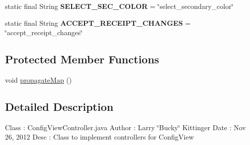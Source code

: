 \begin{DoxyCompactItemize}
\item 
\hypertarget{classw3se_1_1_controller_1_1_config_view_controller_ae34815d1e1caef9b87e6c4c20fe43bcd}{static final String {\bfseries S\-E\-L\-E\-C\-T\-\_\-\-S\-E\-C\-\_\-\-C\-O\-L\-O\-R} = \char`\"{}select\-\_\-secondary\-\_\-color\char`\"{}}\label{classw3se_1_1_controller_1_1_config_view_controller_ae34815d1e1caef9b87e6c4c20fe43bcd}

\item 
\hypertarget{classw3se_1_1_controller_1_1_config_view_controller_ab35e1546bf4d1a7c65c1eaf5a4ec601c}{static final String {\bfseries A\-C\-C\-E\-P\-T\-\_\-\-R\-E\-C\-E\-I\-P\-T\-\_\-\-C\-H\-A\-N\-G\-E\-S} = \char`\"{}accept\-\_\-receipt\-\_\-changes\char`\"{}}\label{classw3se_1_1_controller_1_1_config_view_controller_ab35e1546bf4d1a7c65c1eaf5a4ec601c}

\end{DoxyCompactItemize}
\subsection*{Protected Member Functions}
\begin{DoxyCompactItemize}
\item 
void \hyperlink{classw3se_1_1_controller_1_1_config_view_controller_a06395bc4df65b4e46f8978934e06502d}{propagate\-Map} ()
\end{DoxyCompactItemize}


\subsection{Detailed Description}
Class \-: Config\-View\-Controller.\-java Author \-: Larry \char`\"{}\-Bucky\char`\"{} Kittinger Date \-: Nov 26, 2012 Desc \-: Class to implement controllers for Config\-View 

